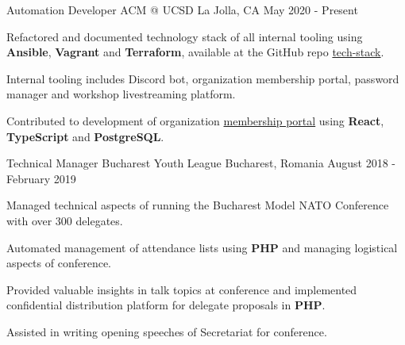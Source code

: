 
\begin{cventries}
  \cventry
    {Automation Developer}
    {ACM @ UCSD}
    {La Jolla, CA}
    {May 2020 - Present}
    {
      \begin{cvitems}
        \item {Refactored and documented technology stack of all internal tooling using \textbf{Ansible}, \textbf{Vagrant} and \textbf{Terraform}, available at the GitHub repo \href{https://github.com/acmucsd/tech-stack}{tech-stack}.}
        \item {Internal tooling includes Discord bot, organization membership portal, password manager and workshop livestreaming platform.}
        \item {Contributed to development of organization \href{https://github.com/acmucsd/membership-portal-ui}{membership portal} using \textbf{React}, \textbf{TypeScript} and \textbf{PostgreSQL}.}
      \end{cvitems}
    }
  \cventry
    {Technical Manager}
    {Bucharest Youth League}
    {Bucharest, Romania}
    {August 2018 - February 2019}
    {
      \begin{cvitems}
        \item {Managed technical aspects of running the Bucharest Model NATO Conference with over 300 delegates.}
        \item {Automated management of attendance lists using \textbf{PHP} and managing logistical aspects of conference.}
        \item {Provided valuable insights in talk topics at conference and implemented confidential distribution platform for delegate proposals in \textbf{PHP}.}
        \item {Assisted in writing opening speeches of Secretariat for conference.}
      \end{cvitems}
    }
\end{cventries}
